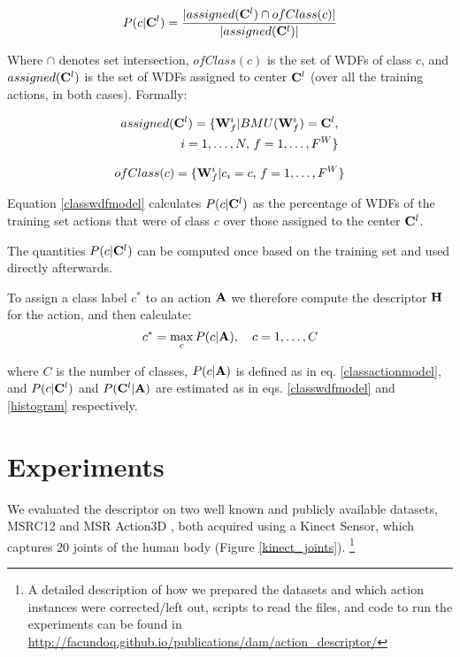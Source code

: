 \documentclass{fcs}
\begin{document}
\begin{equation}
\label{classwdfmodel}
P(c | \mathbf{C}^{l}) = \frac{ | assigned(\mathbf{C}^{l}) \cap ofClass(c) |}{|assigned(\mathbf{C}^{l})| }
\end{equation}

Where $\cap$ denotes set intersection, $ofClass(c)$ is the set of WDFs of class $c$, and $assigned(\mathbf{C}^{l})$ is the set of WDFs assigned to center $\mathbf{C}^{l}$ (over all the training actions, in both cases). Formally:

\begin{align*}
\label{assigned}
assigned(\mathbf{C}^{l})= \{ \mathbf{W}_f^i | BMU(\mathbf{W}_f^i)=\mathbf{C}^{l}, \\
\, i=1,\dots,N, \, f=1,\dots,F^W \}
\end{align*}

\begin{equation*}
\label{ofClass}
ofClass(c)= \{ \mathbf{W}_f^i | c_i=c, \, f=1,\dots,F^W \}
\end{equation*}


Equation \ref{classwdfmodel} calculates $P(c | \mathbf{C}^{l})$ as the percentage of WDFs of the training set actions that were of class $c$ over those assigned to the center $\mathbf{C}^{l}$.

The quantities $P(c | \mathbf{C}^{l})$ can be computed once based on the training set and used directly afterwards.

To assign a class label $c^{*}$ to an action $\mathbf{A}$ we therefore compute the descriptor $\mathbf{H}$ for the action, and then calculate:
\begin{equation}
c^{*} = \max_c P(c | \mathbf{A}), \quad c=1,\dots,C
\end{equation}

where $C$ is the number of classes, $P(c | \mathbf{A})$ is defined as in eq. \ref{classactionmodel}, and $P(c|\mathbf{C}^{l})$ and $P(\mathbf{C}^{l} | \mathbf{A})$ are estimated as in eqs. \ref{classwdfmodel} and \ref{histogram} respectively.

 
\section{Experiments}
\label{experiments}


We evaluated the descriptor on two well known and publicly available datasets, MSRC12 \cite{fothergill2012instructing} and MSR Action3D \cite{li2010action}, both acquired using a Kinect Sensor, which captures 20 joints of the human body (Figure \ref{kinect_joints}). \footnote{A detailed description of how we prepared the datasets and which action instances were corrected/left out, scripts to read the files, and code to run the experiments can be found in \url{http://facundoq.github.io/publications/dam/action_descriptor/}} 
\end{document}
